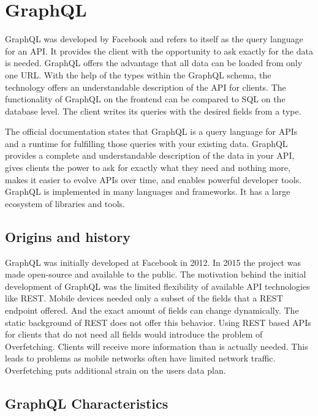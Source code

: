 \section{GraphQL}

GraphQL was developed by Facebook and refers to itself as the query language for an API. It provides the client with the opportunity to ask exactly for the data is needed. GraphQL offers the advantage that all data can be loaded from only one URL. With the help of the types within the GraphQL schema, the technology offers an understandable description of the API for clients. \cite{misc:-:background:graphql:graphql-org} The functionality of GraphQL on the frontend can be compared to SQL on the database level. The client writes its queries with the desired fields from a type.

The official documentation states that GraphQL is a query language for APIs and a runtime for fulfilling those queries with your existing data. GraphQL provides a complete and understandable description of the data in your API, gives clients the power to ask for exactly what they need and nothing more, makes it easier to evolve APIs over time, and enables powerful developer tools. GraphQL is implemented in many languages and frameworks. It has a large ecosystem of libraries and tools.

\subsection{Origins and history}

GraphQL was initially developed at Facebook in 2012. In 2015 the project was made open-source and available to the public. The motivation behind the initial development of GraphQL was the limited flexibility of available API technologies like REST. Mobile devices needed only a subset of the fields that a REST endpoint offered. And the exact amount of fields can change dynamically. The static background of REST does not offer this behavior. Using REST based APIs for clients that do not need all fields would introduce the problem of Overfetching. Clients will receive more information than is actually needed. This leads to problems as mobile networks often have limited network traffic. Overfetching puts additional strain on the users data plan. \cite{misc:2015:bryon:background:graphql:graphql-query-language}

\subsection{GraphQL Characteristics}

